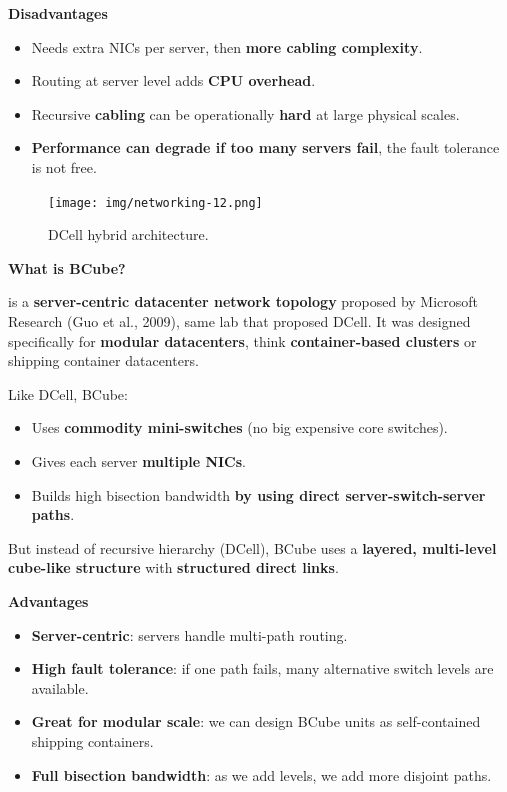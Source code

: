 \highspace
\begin{flushleft}
    \textcolor{Red2}{ \textbf{Disadvantages}}
\end{flushleft}
\begin{itemize}
    \item Needs extra NICs per server, then \textbf{more cabling complexity}.
    \item Routing at server level adds \textbf{CPU overhead}.
    \item Recursive \textbf{cabling} can be operationally \textbf{hard} at large physical scales.
    \item \textbf{Performance can degrade if too many servers fail}, the fault tolerance is not free.
\end{itemize}

\begin{figure}[!htp]
    \centering
    \texttt{[image: img/networking-12.png]}
    \caption{DCell hybrid architecture.}
\end{figure}

\begin{flushleft}
    \textcolor{Green3}{ \textbf{What is BCube?}}
\end{flushleft}
 is a \textbf{server-centric datacenter network topology} proposed by Microsoft Research (Guo et al., 2009), same lab that proposed DCell. It was designed specifically for \textbf{modular datacenters}, think \textbf{container-based clusters} or shipping container datacenters.

\highspace
Like DCell, BCube:
\begin{itemize}
    \item Uses \textbf{commodity mini-switches} (no big expensive core switches).
    \item Gives each server \textbf{multiple NICs}.
    \item Builds high bisection bandwidth \textbf{by using direct server-switch-server paths}.
\end{itemize}
But instead of recursive hierarchy (DCell), BCube uses a \textbf{layered, multi-level cube-like structure} with \textbf{structured direct links}.

\highspace
\begin{flushleft}
    \textcolor{Green3}{ \textbf{Advantages}}
\end{flushleft}
\begin{itemize}
    \item \textbf{Server-centric}: servers handle multi-path routing.
    \item \textbf{High fault tolerance}: if one path fails, many alternative switch levels are available.
    \item \textbf{Great for modular scale}: we can design BCube units as self-contained shipping containers.
    \item \textbf{Full bisection bandwidth}: as we add levels, we add more disjoint paths.
\end{itemize}

